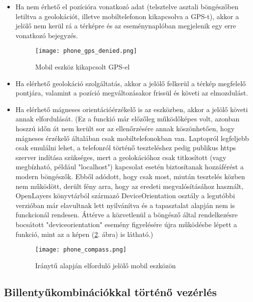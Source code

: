 \begin{itemize}

  \item Ha nem érhető el pozícióra vonatkozó adat (telsztelve asztali
  böngészőben letiltva a geolokációt, illetve mobiltelefonon kikapcsolva a
  GPS-t), akkor a jelölő nem kerül rá a térképre és az eseménynaplóban
  megjelenik egy erre vonatkozó bejegyzés.
  \begin{figure}[H]
    \texttt{[image: phone\_gps\_denied.png]}
    \caption{Mobil eszköz kikapcsolt GPS-el}
    \label{fig:phone_gps_denied}
  \end{figure}

  \item Ha elérhető geolokáció szolgáltatás, akkor a jelölő felkerül a térkép
  megfelelő pontjára, valamint a pozíció megváltozásakor frissül és követi az
  elmozdulást.

  \item Ha elérhető mágneses orientációérzékelő is az eszközben, akkor a jelölő
  követi annak elfordulását.
  (Ez a funckió már előzőleg működőképes volt, azonban hoszzú időn át nem került
  sor az ellenőrzésére annak köszönhetően, hogy mágneses érzékelő általában csak
  mobiltelefonokban van. Laptopról legfeljebb csak emulálni lehet, a telefonról
  történő teszteléshez pedig publikus https szerver indítása szükséges, mert a
  geolokációhoz csak titkosított (vagy megbízható, például "localhost")
  kapcsolat esetén biztosítanak hozzáférést a modern böngészők. Ebből adódott,
  hogy csak most, miután tesztelés közben nem működött, derült fény arra, hogy
  az eredeti megvalósításához használt, OpenLayers könyvtárból származó
  DeviceOrientation osztály a legutóbbi verzióban már elavultnak lett
  nyilvánítva és a tapasztalat alapján nem is funckcionál rendesen. Áttérve a
  közvetlenül a böngésző által rendelkezésre bocsátott "deviceorientation"
  esemény figyelésére újra működésbe lépett a funkció, mint az a képen
  (\ref{fig:phone_compass}. ábra) is látható.)

  \begin{figure}[H]
    \texttt{[image: phone\_compass.png]}
    \caption{Iránytű alapján elforduló jelölő mobil eszközön}
    \label{fig:phone_compass}
  \end{figure}

\end{itemize}


\subsection{Billentyűkombinációkkal történő vezérlés}

